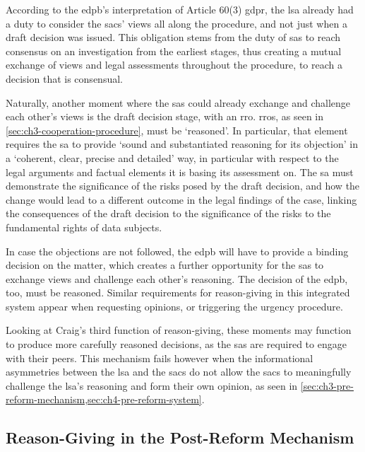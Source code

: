 According to the \gls{edpb}'s interpretation of Article 60(3) \gls{gdpr}, the \gls{lsa} already had a duty to consider the \glspl{sac}' views all along the procedure, and not just when a draft decision was issued.\autocite[124--125]{edpbGuidelines022022}
This obligation stems from the duty of \glspl{sa} to reach consensus on an investigation from the earliest stages, thus creating a mutual exchange of views and legal assessments throughout the procedure, to reach a decision that is consensual.\autocite[125--128]{edpbGuidelines022022}

Naturally, another moment where the \glspl{sa} could already exchange and challenge each other's views is the draft decision stage, with an \gls{rro}.
\glspl{rro}, as seen in \cref{sec:ch3-cooperation-procedure}, must be `reasoned'.
In particular, that element requires the \gls{sa} to provide `sound and substantiated reasoning for its objection' in a `coherent, clear, precise and detailed' way, in particular with respect to the legal arguments and factual elements it is basing its assessment on.\autocite[17--19]{edpbGuidelines092020}
The \gls{sa} must demonstrate the significance of the risks posed by the draft decision, and how the change would lead to a different outcome in the legal findings of the case, linking the consequences of the draft decision to the significance of the risks to the fundamental rights of data subjects.\autocite[16--19]{edpbGuidelines092020}

In case the objections are not followed, the \gls{edpb} will have to provide a binding decision on the matter,\autocite[65(1)(a)]{GDPR} which creates a further opportunity for the \glspl{sa} to exchange views and challenge each other's reasoning.
The decision of the \gls{edpb}, too, must be reasoned.\autocite[65(2)]{GDPR}
Similar requirements for reason-giving in this integrated system appear when requesting opinions, or triggering the urgency procedure.\autocite[66(1)--(3)]{GDPR}

Looking at Craig's third function of reason-giving, these moments may function to produce more carefully reasoned decisions, as the \glspl{sa} are required to engage with their peers.
This mechanism fails however when the informational asymmetries between the \gls{lsa} and the \glspl{sac} do not allow the \glspl{sac} to meaningfully challenge the \gls{lsa}'s reasoning and form their own opinion,\autocite[504]{mustertProceduralisingEnforcement2026} as seen in \cref{sec:ch3-pre-reform-mechanism,sec:ch4-pre-reform-system}.

\subsection{Reason-Giving in the Post-Reform Mechanism}
\label{sec:ch5-post-reform-reason-giving}
